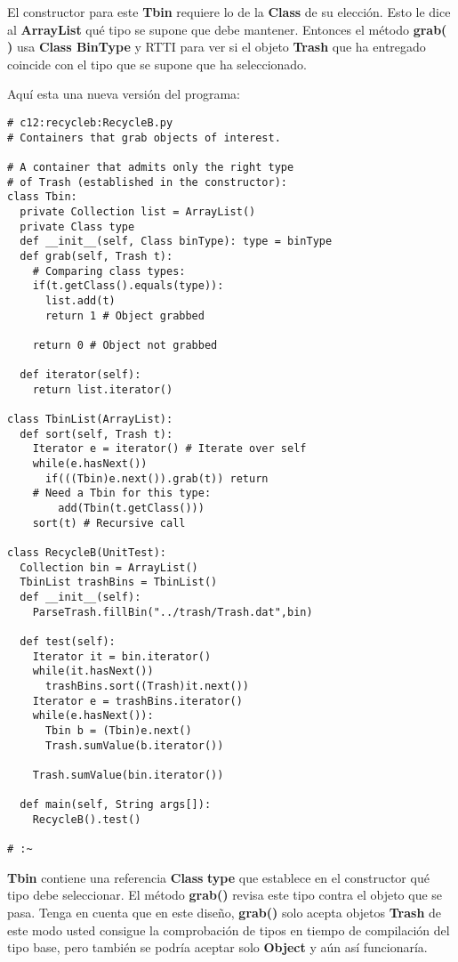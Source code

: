 El constructor para este \textbf{Tbin} requiere lo de la \textbf{Class} de su elección. Esto le dice al \textbf{ArrayList} qué tipo se supone que debe mantener. Entonces el método \textbf{grab( )} usa \textbf{Class BinType} y RTTI para ver si el objeto \textbf{Trash} que ha entregado coincide con el tipo que se supone que ha seleccionado.      \newline

Aquí esta una nueva versión del programa:       \newline

\begin{lstlisting} 
# c12:recycleb:RecycleB.py 
# Containers that grab objects of interest. 

# A container that admits only the right type 
# of Trash (established in the constructor): 
class Tbin: 
  private Collection list = ArrayList() 
  private Class type 
  def __init__(self, Class binType): type = binType  
  def grab(self, Trash t): 
    # Comparing class types: 
    if(t.getClass().equals(type)): 
      list.add(t) 
      return 1 # Object grabbed 
      
    return 0 # Object not grabbed  
    
  def iterator(self): 
    return list.iterator() 
    
class TbinList(ArrayList): 
  def sort(self, Trash t): 
    Iterator e = iterator() # Iterate over self 
    while(e.hasNext()) 
      if(((Tbin)e.next()).grab(t)) return 
    # Need a Tbin for this type: 
        add(Tbin(t.getClass())) 
    sort(t) # Recursive call 
    
class RecycleB(UnitTest): 
  Collection bin = ArrayList() 
  TbinList trashBins = TbinList() 
  def __init__(self): 
    ParseTrash.fillBin("../trash/Trash.dat",bin) 
    
  def test(self): 
    Iterator it = bin.iterator() 
    while(it.hasNext()) 
      trashBins.sort((Trash)it.next()) 
    Iterator e = trashBins.iterator() 
    while(e.hasNext()): 
      Tbin b = (Tbin)e.next() 
      Trash.sumValue(b.iterator()) 
      
    Trash.sumValue(bin.iterator()) 
    
  def main(self, String args[]): 
    RecycleB().test() 
    
# :~ 
\end{lstlisting}

\textbf{Tbin} contiene una referencia \textbf{Class} \textbf{type} que establece en el constructor qué tipo debe seleccionar. El método \textbf{grab()} revisa este tipo contra el objeto que se pasa. Tenga en cuenta que en este diseño, \textbf{grab()} solo acepta objetos \textbf{Trash} de este modo usted consigue la comprobación de tipos en tiempo de compilación del tipo base, pero también se podría aceptar solo \textbf{Object} y aún así funcionaría.      \newline

